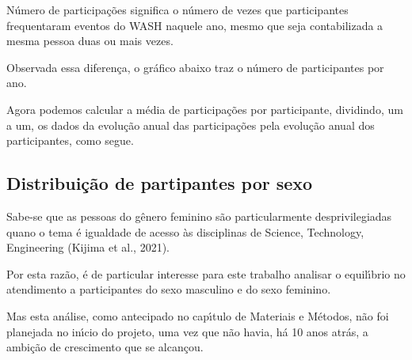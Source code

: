 \documentclass[
12pt,		%
openright,	%
twoside,  %
a4paper,			%
chapter=TITLE,		%
english,			%
french,				%
spanish,			%
brazil				%
]{USPSC-classe/USPSC_RedarTex}
\begin{document}
N\'umero de participa\c{c}\~oes significa o n\'umero de vezes que participantes frequentaram eventos do WASH naquele ano, mesmo que seja contabilizada a mesma pessoa duas ou mais vezes.










Observada essa diferen\c{c}a, o gr\'afico abaixo traz o n\'umero de participantes por ano.










Agora podemos calcular a m\'edia de participa\c{c}\~oes por participante, dividindo, um a um, os dados da evolu\c{c}\~ao anual das participa\c{c}\~oes pela evolu\c{c}\~ao anual dos participantes, como segue.










\subsection[Distribui\c{c}\~ao de partipantes por sexo]{Distribui\c{c}\~ao de partipantes por sexo}\label{Distribui\c{c}\~ao de partipantes por sexo}
Sabe-se que as pessoas do g\^enero feminino s\~ao particularmente desprivilegiadas quano o tema \'e igualdade de acesso \`as disciplinas de Science, Technology, Engineering  (Kijima et al., 2021).










Por esta raz\~ao, \'e de particular interesse para este trabalho analisar o equil\'{\i}brio no atendimento a participantes do sexo masculino e do sexo feminino.










Mas esta an\'alise, como antecipado no cap\'{\i}tulo de Materiais e M\'etodos, n\~ao foi planejada no in\'{\i}cio do projeto, uma vez que n\~ao havia, h\'a 10 anos atr\'as, a ambi\c{c}\~ao de crescimento que se alcan\c{c}ou.
\end{document}
